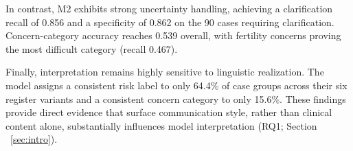 In contrast, M2 exhibits strong uncertainty handling, achieving a clarification recall of 0.856 and a specificity of 0.862 on the 90 cases requiring clarification. Concern-category accuracy reaches 0.539 overall, with fertility concerns proving the most difficult category (recall 0.467).

Finally, interpretation remains highly sensitive to linguistic realization. The model assigns a consistent risk label to only 64.4\% of case groups across their six register variants and a consistent concern category to only 15.6\%. These findings provide direct evidence that surface communication style, rather than clinical content alone, substantially influences model interpretation (RQ1; Section ~\ref{sec:intro}).


\begin{table}[t!]
\centering


\caption{Results on the English evaluation set ($n=540$).
M2 is the zero-shot baseline; M3 is QLoRA adaptation using structured
JSON targets; M3+O adds 4$\times$ oversampling of clarification
examples; and M3-ML is joint English--French--Arabic adaptation using
the M3+O recipe, evaluated here on English. ``Base'' denotes the
majority-class baseline. Lower is better for under-triage. Best values
per row are shown in \textbf{bold}. Consistency is the fraction of case
groups assigned the same label across all six communication styles.}

\label{tab:main}
\end{table}

